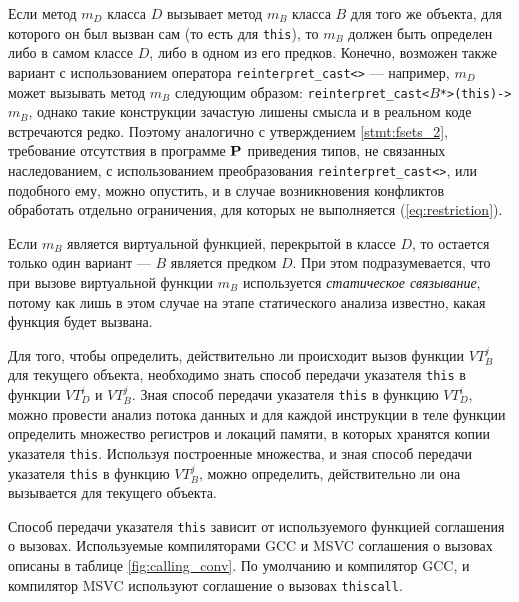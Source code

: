 Если метод $m_D$ класса $D$ вызывает метод $m_B$ класса $B$ для того же объекта, для которого он был вызван сам (то есть для \lstinline{this}), то $m_B$ должен быть определен либо в самом классе $D$, либо в одном из его предков. Конечно, возможен также вариант с использованием оператора \lstinline{reinterpret_cast<>} --- например, $m_D$ может вызывать метод $m_B$ следующим образом: \lstinline{reinterpret_cast<}$B$\lstinline{*>(this)->}$m_B$, однако такие конструкции зачастую лишены смысла и в реальном коде встречаются редко. Поэтому аналогично с утверждением \ref{stmt:fsets_2}, требование отсутствия в программе $\mathbf{P}$ приведения типов, не связанных наследованием, с использованием преобразования \lstinline{reinterpret_cast<>}, или подобного ему, можно опустить, и в случае возникновения конфликтов обработать отдельно ограничения, для которых не выполняется (\ref{eq:restriction}).

Если $m_B$ является виртуальной функцией, перекрытой в классе $D$, то остается только один вариант --- $B$ является предком $D$. При этом подразумевается, что при вызове виртуальной функции $m_B$ используется {\it статическое связывание}, потому как лишь в этом случае на этапе статического анализа известно, какая функция будет вызвана.

Для того, чтобы определить, действительно ли происходит вызов функции $VT_B^j$ для текущего объекта, необходимо знать способ передачи указателя \lstinline{this} в функции $VT_D^i$ и $VT_B^j$. Зная способ передачи указателя \lstinline{this} в функцию $VT_D^i$, можно провести анализ потока данных и для каждой инструкции в теле функции определить множество регистров и локаций памяти, в которых хранятся копии указателя \lstinline{this}. Используя построенные множества, и зная способ передачи указателя \lstinline{this} в функцию $VT_B^j$, можно определить, действительно ли она вызывается для текущего объекта.

Способ передачи указателя \lstinline{this} зависит от используемого функцией соглашения о вызовах. Используемые компиляторами GCC и MSVC соглашения о вызовах описаны в таблице \ref{fig:calling_conv}. По умолчанию и компилятор GCC, и компилятор MSVC используют соглашение о вызовах \lstinline{thiscall}.


